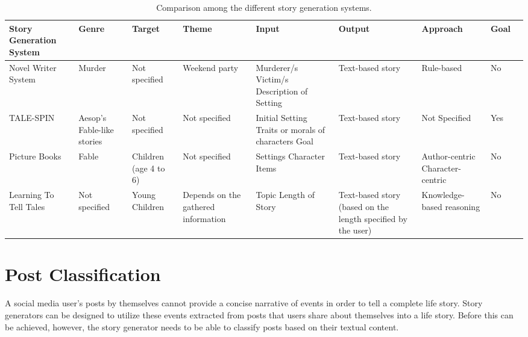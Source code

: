 \begin{sidewaystable}[ph!]   %
\centering
\caption{Comparison among the different story generation systems.} \vspace{0.25em}
\begin{tabular}{|p{1in}|p{2cm}|p{2cm}|p{2cm}|p{2cm}|p{2cm}|p{2cm}|p{2cm}|p{2cm}|} \hline
\centering Story Generation System & Genre & Target & Theme & Input & Output & Approach & Goal \\ \hline
Novel Writer System & Murder & Not specified & Weekend party & Murderer/s \newline Victim/s \newline Description of Setting & Text-based story & Rule-based & No\\ \hline
TALE-SPIN & Aesop's Fable-like stories & Not specified & Not specified & Initial Setting \newline Traits or morals of characters \newline Goal & Text-based story & Not Specified & Yes \\ \hline
Picture Books & Fable & Children (age 4 to 6) & Not specified & Settings \newline Character \newline Items & Text-based story & Author-centric \newline Character-centric & No \\ \hline
Learning To Tell Tales & Not specified  & Young Children  & Depends on the gathered information & Topic \newline Length of Story & Text-based story (based on the length specified by the user) & Knowledge-based reasoning & No \\ \hline
\end{tabular}
\label{tab:StorytellingSystems}
\end{sidewaystable}
\clearpage

\section{Post Classification}
A social media user's posts by themselves cannot provide a concise narrative of events in order to tell a complete life story. Story generators can be designed to utilize these events extracted from posts that users share about themselves into a life story. Before this can be achieved, however, the story generator needs to be able to classify posts based on their textual content.

